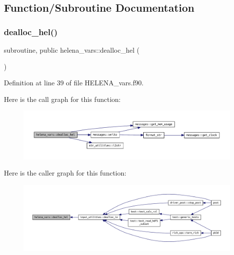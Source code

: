 \subsection{Function/\+Subroutine Documentation}
\mbox{\label{namespacehelena__vars_add7b3eea7306eca7fb45737ff915523f}} 
\subsubsection{\texorpdfstring{dealloc\+\_\+hel()}{dealloc\_hel()}}
{\footnotesize\ttfamily subroutine, public helena\+\_\+vars\+::dealloc\+\_\+hel (\begin{DoxyParamCaption}{ }\end{DoxyParamCaption})}



Definition at line 39 of file H\+E\+L\+E\+N\+A\+\_\+vars.\+f90.

Here is the call graph for this function\+:
\nopagebreak
\begin{figure}[H]
\begin{center}
\leavevmode
\includegraphics[width=350pt]{namespacehelena__vars_add7b3eea7306eca7fb45737ff915523f_cgraph}
\end{center}
\end{figure}
Here is the caller graph for this function\+:
\nopagebreak
\begin{figure}[H]
\begin{center}
\leavevmode
\includegraphics[width=350pt]{namespacehelena__vars_add7b3eea7306eca7fb45737ff915523f_icgraph}
\end{center}
\end{figure}


